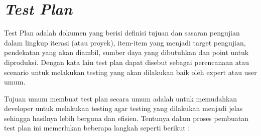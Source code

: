 \section {\textit{Test Plan}}
\par Test Plan adalah dokumen yang berisi definisi tujuan dan sasaran pengujian dalam lingkup iterasi (atau proyek), item-item yang menjadi target pengujian, pendekatan yang akan diambil, sumber daya yang dibutuhkan dan point untuk diproduksi. Dengan kata lain test plan dapat disebut sebagai perencanaan atau scenario untuk melakukan testing yang akan dilakukan baik oleh expert atau user umum. \citep{Shanardi}
\par Tujuan umum membuat test plan secara umum adalah untuk memudahkan developer untuk melakukan testing agar testing yang dilakukan menjadi jelas sehingga hasilnya lebih berguna dan efisien. Tentunya dalam proses pembuatan test plan ini memerlukan beberapa langkah seperti berikut :
